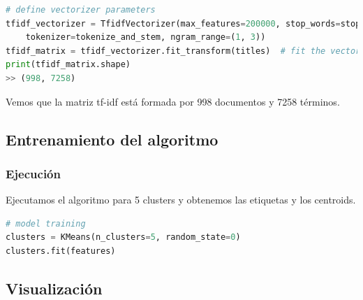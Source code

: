 \documentclass{uimppracticas}
\begin{document}
\begin{lstlisting}[language=python]
# define vectorizer parameters
tfidf_vectorizer = TfidfVectorizer(max_features=200000, stop_words=stopwords, use_idf=True,
	tokenizer=tokenize_and_stem, ngram_range=(1, 3))
tfidf_matrix = tfidf_vectorizer.fit_transform(titles)  # fit the vectorizer to titles
print(tfidf_matrix.shape)
>> (998, 7258)
\end{lstlisting}

Vemos que la matriz tf-idf está formada por 998 documentos y 7258 términos.

\subsection{Entrenamiento del algoritmo}

\subsubsection{Ejecución}

Ejecutamos el algoritmo para 5 clusters y obtenemos las etiquetas y los centroids.

\begin{lstlisting}[language=python]
# model training
clusters = KMeans(n_clusters=5, random_state=0)
clusters.fit(features)
\end{lstlisting}

\subsection{Visualización}

\renewcommand{\refname}{Bibliografía}


\end{document}
